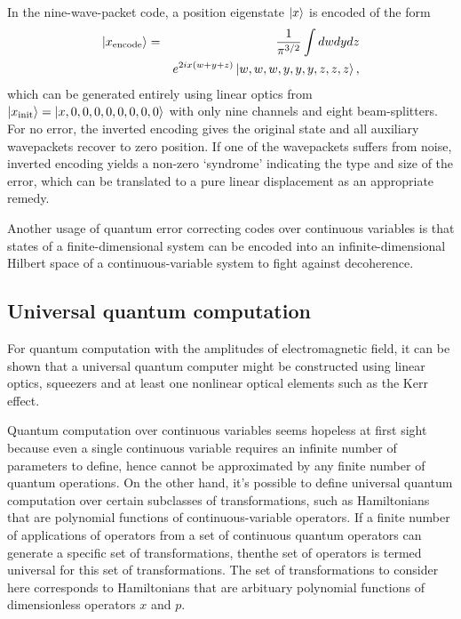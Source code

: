 \documentclass[%
 reprint,
groupedaddress,
showpacs,
 amsmath,amssymb,
 aps,
prb,
]{revtex4-1}
\begin{document}
		In the nine-wave-packet code, a position eigenstate $\ket x$ is encoded of the form
		\begin{eqnarray}
		\ket{x_{\text{encode}}} &=& \frac{1}{\pi^{3/2}} \int dwdydz \notag\\
		&& e^{2ix(w+y+z)}\ket{w,w,w,y,y,y,z,z,z},
		\end{eqnarray}
		which can be generated entirely using linear optics from $\ket{x_{\text{init}}} = \ket{x,0,0,0,0,0,0,0,0} $ with only nine channels and eight beam-splitters.\cite{nature.10.1038.27850} For no error, the inverted encoding gives the original state and all auxiliary wavepackets recover to zero position. If one of the wavepackets suffers from noise, inverted encoding yields a non-zero `syndrome' indicating the type and size of the error, which can be translated to a pure linear displacement as an appropriate remedy.
		
		Another usage of quantum error correcting codes over continuous variables is that states of a finite-dimensional system can be encoded into an infinite-dimensional Hilbert space of a continuous-variable system to fight against decoherence.\cite{PhysRevA.64.012310}
		

	\subsection{Universal quantum computation} %
	\label{sub:universal_quantum_computation}

		For quantum computation with the amplitudes of electromagnetic field, it can be shown that a universal quantum computer might be constructed using linear optics, squeezers and at least one nonlinear optical elements such as the Kerr effect.

		Quantum computation over continuous variables seems hopeless at first sight because even a single continuous variable requires an infinite number of parameters to define, hence cannot be approximated by any finite number of quantum operations. On the other hand, it's possible to define universal quantum computation over certain subclasses of transformations, such as Hamiltonians that are polynomial functions of continuous-variable operators. If a finite number of applications of operators from a set of continuous quantum operators can generate a specific set of transformations, thenthe set of operators is termed universal for this set of transformations. The set of transformations to consider here corresponds to Hamiltonians that are arbituary polynomial functions of dimensionless operators $x$ and $p$.
\end{document}
